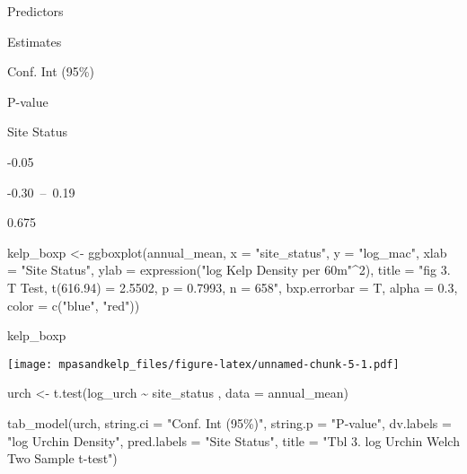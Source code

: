 \documentclass[
]{article}
\newenvironment{Shaded}{\begin{snugshade}}{\end{snugshade}}
\newcommand{\AttributeTok}[1]{\textcolor[rgb]{0.77,0.63,0.00}{#1}}
\newcommand{\DecValTok}[1]{\textcolor[rgb]{0.00,0.00,0.81}{#1}}
\newcommand{\FloatTok}[1]{\textcolor[rgb]{0.00,0.00,0.81}{#1}}
\newcommand{\FunctionTok}[1]{\textcolor[rgb]{0.00,0.00,0.00}{#1}}
\newcommand{\NormalTok}[1]{#1}
\newcommand{\OtherTok}[1]{\textcolor[rgb]{0.56,0.35,0.01}{#1}}
\newcommand{\SpecialCharTok}[1]{\textcolor[rgb]{0.00,0.00,0.00}{#1}}
\newcommand{\StringTok}[1]{\textcolor[rgb]{0.31,0.60,0.02}{#1}}
\begin{document}
Predictors

Estimates

Conf. Int (95\%)

P-value

Site Status

-0.05

-0.30~--~0.19

0.675

\begin{Shaded}
\begin{Highlighting}[]
\NormalTok{kelp\_boxp }\OtherTok{\textless{}{-}} \FunctionTok{ggboxplot}\NormalTok{(annual\_mean, }\AttributeTok{x =} \StringTok{"site\_status"}\NormalTok{, }\AttributeTok{y =} \StringTok{"log\_mac"}\NormalTok{,}
                     \AttributeTok{xlab =} \StringTok{"Site Status"}\NormalTok{, }\AttributeTok{ylab =} \FunctionTok{expression}\NormalTok{(}\StringTok{"log Kelp Density per 60m"}\SpecialCharTok{\^{}}\DecValTok{2}\NormalTok{), }
                     \AttributeTok{title =} \StringTok{"fig 3. T Test, t(616.94) = 2.5502, p = 0.7993, n = 658"}\NormalTok{,}
                     \AttributeTok{bxp.errorbar =}\NormalTok{ T,}
                     \AttributeTok{alpha =} \FloatTok{0.3}\NormalTok{, }
                     \AttributeTok{color =} \FunctionTok{c}\NormalTok{(}\StringTok{"blue"}\NormalTok{, }\StringTok{"red"}\NormalTok{))}

\NormalTok{kelp\_boxp}
\end{Highlighting}
\end{Shaded}

\texttt{[image: mpasandkelp\_files/figure-latex/unnamed-chunk-5-1.pdf]}

\begin{Shaded}
\begin{Highlighting}[]
\NormalTok{urch }\OtherTok{\textless{}{-}} \FunctionTok{t.test}\NormalTok{(log\_urch }\SpecialCharTok{\textasciitilde{}}\NormalTok{ site\_status , }\AttributeTok{data =}\NormalTok{ annual\_mean)}

\FunctionTok{tab\_model}\NormalTok{(urch,}
          \AttributeTok{string.ci =} \StringTok{"Conf. Int (95\%)"}\NormalTok{,}
          \AttributeTok{string.p =} \StringTok{"P{-}value"}\NormalTok{,}
          \AttributeTok{dv.labels =} \StringTok{"log Urchin Density"}\NormalTok{,}
          \AttributeTok{pred.labels =} \StringTok{"Site Status"}\NormalTok{,}
          \AttributeTok{title =} \StringTok{"Tbl 3. log Urchin Welch Two Sample t{-}test"}\NormalTok{)}
\end{Highlighting}
\end{Shaded}
\end{document}
